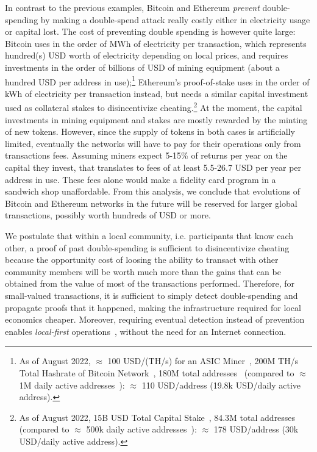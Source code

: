 \documentclass[sigplan,screen,10pt,review,anonymous]{acmart}
\begin{document}
In contrast to the previous examples, Bitcoin and Ethereum \textit{prevent} double-spending by making a double-spend attack really costly either in electricity usage or capital lost. The cost of preventing double spending is however quite large: Bitcoin uses in the order of MWh of electricity per transaction, which represents hundred(s) USD worth of electricity depending on local prices, and requires investments in the order of billions of USD of mining equipment (about a hundred USD per address in use);\footnote{As of August 2022, $\approx$ 100 USD/(TH/s) for an ASIC Miner~\cite{bitcoin-asic-mining}, 200M TH/s Total Hashrate of Bitcoin Network~\cite{total-hashrate}, 180M total addresses~\cite{bitcoin-stats} (compared to $\approx$ 1M daily active addresses~\cite{bitcoin-daily-active-addresses}): $\approx$ 110 USD/address (19.8k USD/daily active address).} Ethereum's proof-of-stake uses in the order of kWh of electricity per transaction instead, but needs a similar capital investment used as collateral stakes to disincentivize cheating.\footnote{As of August 2022, 15B USD Total Capital Stake~\cite{proof-of-stake}, 84.3M total addresses~\cite{ethereum-addresses} (compared to $\approx$ 500k daily active addresses~\cite{ethereum-daily-active-addresses}): $\approx$ 178 USD/address (30k USD/daily active address).} At the moment, the capital investments in mining equipment and stakes are mostly rewarded by the minting of new tokens. However, since the supply of tokens in both cases is artificially limited, eventually the networks will have to pay for their operations only from transactions fees. Assuming miners expect 5-15\% of returns per year on the capital they invest, that translates to fees of at least 5.5-26.7 USD per year per address in use. These fees alone would make a fidelity card program in a sandwich shop unaffordable. From this analysis, we conclude that evolutions of Bitcoin and Ethereum networks in the future will be reserved for larger global transactions, possibly worth hundreds of USD or more.

We postulate that within a local community, i.e. participants that know each other, a proof of past double-spending is sufficient to disincentivize cheating because the opportunity cost of loosing the ability to transact with other community members will be worth much more than the gains that can be obtained from the value of most of the transactions performed. Therefore, for small-valued transactions, it is sufficient to simply detect double-spending and propagate proofs that it happened, making the infrastructure required for local economics cheaper. Moreover, requiring eventual detection instead of prevention enables \textit{local-first} operations~\cite{kleppmann2019local-first-software}, without the need for an Internet connection.
\end{document}
